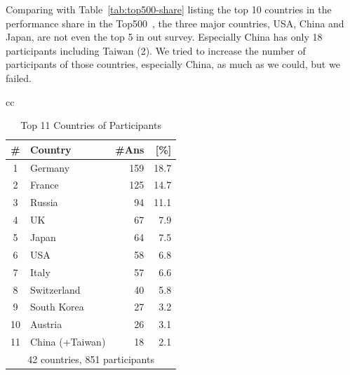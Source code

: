 \documentclass[conference,10pt,letterpaper]{IEEEtran}
\begin{document}
Comparing with Table~\ref{tab:top500-share} listing the top 10
countries in the performance share in the Top500~\cite{Top500}, the
three major countries, USA, China and Japan, are not even the top 5 in
out survey. Especially China has only 18 participants including
Taiwan (2). We tried to increase the number of participants of those
countries, especially China, as much as we could, but we failed.
%
\begin{table}[htb]%
  \begin{center}%
    \begin{tabular}[t]{cc}
      \begin{minipage}[t]{0.5\hsize}
        \begin{center}%
          \caption{Top 11 Countries of Participants}%
          \label{tab:countries}%
          \begin{tabular}{c|l|r|r}%
            \hline%
            \# & Country & \#Ans & [\%] \\%
            \hline%
            1 & Germany 	& 159 & 18.7 \\%
            2 & France 	& 125 & 14.7 \\%
            3 & Russia 	& 94  & 11.1 \\%
            4 & UK 		& 67  &  7.9 \\%
            5 & Japan 	& 64  &  7.5 \\%
            6 & USA 	& 58  &  6.8 \\%
            7 & Italy 	& 57  &  6.6 \\%
            \hline%
            8 & Switzerland & 40  &  5.8 \\%
            9 & South Korea & 27  &  3.2 \\%
            10 & Austria 	& 26  &  3.1 \\%
            11 & China (+Taiwan) & 18 & 2.1 \\%
            \hline%
            \multicolumn{4}{c}{42 countries, 851 participants} \\%
          \end{tabular}%
        \end{center}%
      \end{minipage}
      \begin{minipage}[t]{0.5\hsize}

\end{minipage}
\end{tabular}
\end{center}
\end{table}
\end{document}

